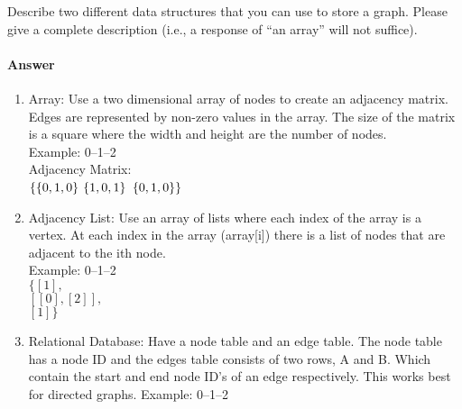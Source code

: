 \documentclass{article}
\begin{document}



\nextprob
{}

Describe two different data structures that you can use to store a graph.
Please give a complete description (i.e., a response of ``an array'' will not
suffice).

\paragraph{Answer}


\begin{enumerate}
	\item Array: Use a two dimensional array of nodes to create an adjacency matrix. Edges are represented by non-zero values in the array. The size of the matrix is a square where the width and height are the number of nodes. \\
	Example: 0--1--2\\
	Adjacency Matrix:\\
	$\{\{0, 1, 0\}\\$
	$\{1, 0, 1\}\\$
	$\{0, 1, 0\}\}\\$

	\item Adjacency List: Use an array of lists where each index of the array is a vertex. At each index in the array (array[i]) there is a list of nodes that are adjacent to the ith node. \\
	Example: 0--1--2\\
	$\{[1],$\\
	$[[0],[2]],$\\
	$[1]\}$\\

	\item Relational Database: Have a node table and an edge table. The node table has a node ID and the edges table consists of two rows, A and B. Which contain the start and end node ID's of an edge respectively. This works best for directed graphs.
	Example: 0--1--2\\


\end{enumerate}
\end{document}
